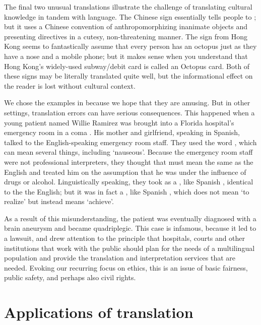 The final two unusual translations illustrate the challenge of translating cultural knowledge in tandem with language.  The Chinese sign  essentially tells people to ; but it uses a Chinese convention of anthropomorphizing inanimate objects and presenting directives in a cutesy, non-threatening manner.  The sign from Hong Kong  seems to fantastically assume that every person has an octopus just as they have a nose and a mobile phone; but it makes sense when you understand that Hong Kong's widely-used subway/debit card is called an Octopus card.  Both of these signs may be literally translated quite well, but the informational effect on the reader is lost without cultural context.


We chose the examples in  because we hope that they are amusing. 
But in other settings, translation errors can 
have serious consequences. This happened when a 
young  patient named Willie Ramirez was brought into a Florida hospital's emergency room in a coma \citep{harsham:84}.
His
 mother and girlfriend, speaking in Spanish,
talked to the English-speaking emergency room staff.
They used the word
, which can mean several things, including `nauseous'.
Because the emergency room staff were not professional interpreters, they thought
that  must mean the same as the English  and treated
him on the assumption that he was under the
influence of drugs or alcohol. Linguistically speaking, they took  as a , like Spanish , identical to the the English; but it was in fact a , like Spanish , which does not mean `to realize' but instead means `achieve'.

As a result of this misunderstanding, the patient was eventually diagnosed with a brain aneurysm and
became quadriplegic. This case is infamous, because it led to a lawsuit, and drew attention to the principle that
hospitals, courts and other institutions that work with the public
should plan for the needs of a multilingual population and provide the translation and interpretation services 
that are needed.
Evoking our recurring focus on ethics, this is an issue of basic fairness, public safety, and perhaps also civil rights.  

\section{Applications of translation} \label{translateneeds}



